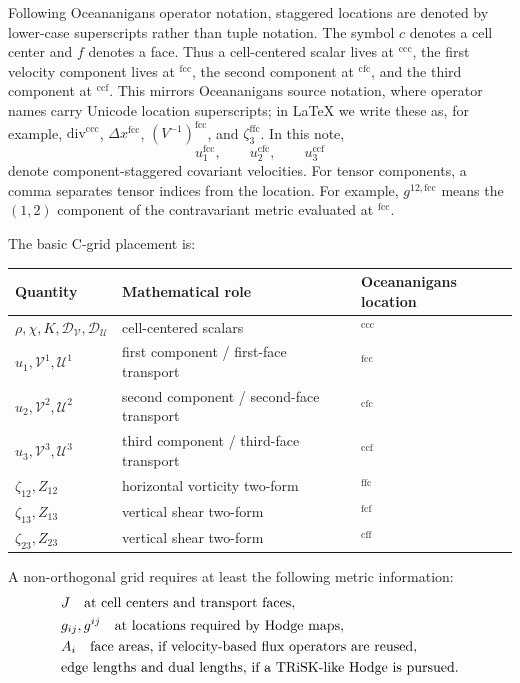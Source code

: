 \documentclass[11pt]{article}
\newcommand{\mc}[1]{\mathcal{#1}}
\newcommand{\Div}{\mc{D}}
\newcommand{\Vflux}{\mc{V}}
\newcommand{\Uflux}{\mc{U}}
\newcommand{\Dvol}{\Div_{\Vflux}}
\newcommand{\Dmass}{\Div_{\Uflux}}
\newcommand{\loc}[1]{^{\mathrm{#1}}}
\begin{document}
Following Oceananigans operator notation, staggered locations are denoted by lower-case superscripts rather than tuple notation.  The symbol \(c\) denotes a cell center and \(f\) denotes a face.  Thus a cell-centered scalar lives at \(\loc{ccc}\), the first velocity component lives at \(\loc{fcc}\), the second component at \(\loc{cfc}\), and the third component at \(\loc{ccf}\).  This mirrors Oceananigans source notation, where operator names carry Unicode location superscripts; in LaTeX we write these as, for example, \(\mathrm{div}\loc{ccc}\), \(\Delta x\loc{fcc}\), \((V^{-1})\loc{fcc}\), and \(\zeta_3\loc{ffc}\).  In this note,
\begin{equation}
  u_1\loc{fcc},\qquad u_2\loc{cfc},\qquad u_3\loc{ccf}
\end{equation}
denote component-staggered covariant velocities.  For tensor components, a comma separates tensor indices from the location.  For example, \(g^{12,\mathrm{fcc}}\) means the \((1,2)\) component of the contravariant metric evaluated at \(\loc{fcc}\).

The basic C-grid placement is:
\begin{center}
\begin{tabular}{lll}
\toprule
Quantity & Mathematical role & Oceananigans location \\
\midrule
\(\rho,\chi,K,\Dvol,\Dmass\) & cell-centered scalars & \(\loc{ccc}\) \\
\(u_1,\Vflux^1,\Uflux^1\) & first component / first-face transport & \(\loc{fcc}\) \\
\(u_2,\Vflux^2,\Uflux^2\) & second component / second-face transport & \(\loc{cfc}\) \\
\(u_3,\Vflux^3,\Uflux^3\) & third component / third-face transport & \(\loc{ccf}\) \\
\(\zeta_{12},Z_{12}\) & horizontal vorticity two-form & \(\loc{ffc}\) \\
\(\zeta_{13},Z_{13}\) & vertical shear two-form & \(\loc{fcf}\) \\
\(\zeta_{23},Z_{23}\) & vertical shear two-form & \(\loc{cff}\) \\
\bottomrule
\end{tabular}
\end{center}

A non-orthogonal grid requires at least the following metric information:
\begin{align}
  &J \quad \hbox{at cell centers and transport faces}, \\
  &g_{ij},g^{ij} \quad \hbox{at locations required by Hodge maps}, \\
  &A_i \quad \hbox{face areas, if velocity-based flux operators are reused}, \\
  &\hbox{edge lengths and dual lengths, if a TRiSK-like Hodge is pursued}.
\end{align}
\end{document}
